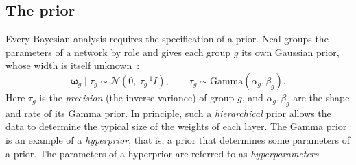 \documentclass[11pt]{article}
\newcommand{\code}[1]{\texttt{#1}}
\newcommand{\mhh}{m_{hh}}
\newcommand{\bw}{\boldsymbol{\omega}}
\begin{document}
\subsection{The prior}
\label{sec:prior}
Every Bayesian analysis requires the specification of a prior.
Neal groups the parameters of a network by role and gives each group $g$ its own
Gaussian prior, whose width is itself unknown~\cite[ch.~2 and 3]{neal1996}:
\begin{equation}
  \bw_g \mid \tau_g \sim \mathcal{N}\!\left(0,\ \tau_g^{-1} I\right), \qquad
  \tau_g \sim \text{Gamma}(\alpha_g, \beta_g).
  \label{eq:prior}
\end{equation}
Here $\tau_g$ is the \emph{precision} (the inverse variance) of group $g$, and
$\alpha_g, \beta_g$ are the shape and rate of its Gamma prior. In principle, such a
\emph{hierarchical} prior allows the data to determine the typical size of the weights of each layer. 
The Gamma prior is an example of a \emph{hyperprior}, that is, a prior that determines some
parameters of 
a prior. The parameters of a hyperprior are referred to as \emph{hyperparameters}.
\end{document}

